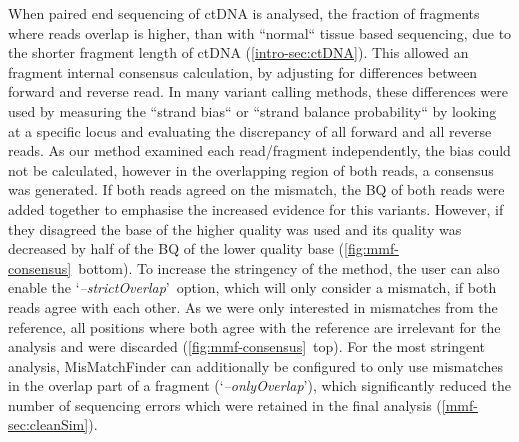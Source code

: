 When paired end sequencing of ctDNA is analysed, the fraction of fragments where reads overlap is higher, than with ``normal`` tissue based sequencing, due to the shorter fragment length of ctDNA (\autoref{intro-sec:ctDNA}). This allowed an fragment internal consensus calculation, by adjusting for differences between forward and reverse read. In many variant calling methods, these differences were used by measuring the ``strand bias`` \cite{Guo2012, Saunders2012, GATKTeam2019} or ``strand balance probability`` \cite{Garrison2012} by looking at a specific locus and evaluating the discrepancy of all forward and all reverse reads. As our method examined each read/fragment independently, the bias could not be calculated, however in the overlapping region of both reads, a consensus was generated. If both reads agreed on the mismatch, the BQ of both reads were added together to emphasise the increased evidence for this variants. However, if they disagreed the base of the higher quality was used and its quality was decreased by half of the BQ of the lower quality base (\autoref{fig:mmf-consensus}~bottom). To increase the stringency of the method, the user can also enable the \lq\emph{--strictOverlap}\rq\ option, which will only consider a mismatch, if both reads agree with each other. As we were only interested in mismatches from the reference, all positions where both agree with the reference are irrelevant for the analysis and were discarded (\autoref{fig:mmf-consensus}~top). For the most stringent analysis, MisMatchFinder can additionally be configured to only use mismatches in the overlap part of a fragment (\lq\emph{--onlyOverlap}\rq), which significantly reduced the number of sequencing errors which were retained in the final analysis (\autoref{mmf-sec:cleanSim}).

